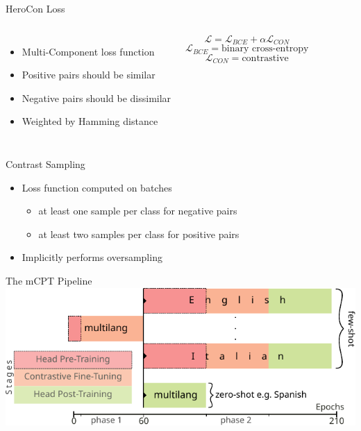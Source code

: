 \documentclass[aspectratio=169,onlytextwidth]{beamer}
\begin{document}
\begin{frame}{HeroCon Loss\footnotemark}
  \begin{columns}[T]
      \begin{itemize}
        \item Multi-Component loss function
        \item Positive pairs should be similar
        \item Negative pairs should be dissimilar
        \item Weighted by Hamming distance
      \end{itemize}

      \begin{equation*}
        \mathcal{L} = \mathcal{L}_{BCE} + \alpha \mathcal{L}_{CON}
      \end{equation*}
      \begin{equation*}
        \mathcal{L}_{BCE} = \text{binary cross-entropy}
      \end{equation*}
      \begin{equation*}
        \mathcal{L}_{CON} = \text{contrastive}
      \end{equation*}
  \end{columns}

\end{frame}

\begin{frame}{Contrast Sampling}
  \begin{itemize}
    \item Loss function computed on batches
      \begin{itemize}
        \item at least one sample per class for negative pairs
        \item at least two samples per class for positive pairs
      \end{itemize}
    \item Implicitly performs oversampling
  \end{itemize}
\end{frame}

\begin{frame}{The mCPT Pipeline}
  \centering
  \includegraphics[height=0.6\textheight]{pipeline_hlpretrain}
\end{frame}
\end{document}
